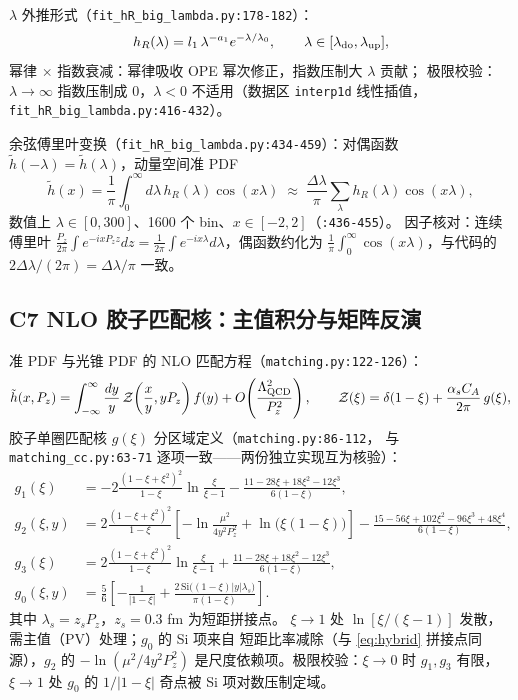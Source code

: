 \documentclass[UTF8]{ctexart}
\begin{document}
$\lambda$ 外推形式（\texttt{fit\_hR\_big\_lambda.py:178-182}）：
\begin{equation}\label{eq:lamext}
h_R(\lambda) = l_1\, \lambda^{-a_1} e^{-\lambda/\lambda_0},\qquad \lambda\in[\lambda_{\rm do},\lambda_{\rm up}],
\end{equation}
幂律 $\times$ 指数衰减：幂律吸收 OPE 幂次修正，指数压制大 $\lambda$ 贡献；
极限校验：$\lambda\to\infty$ 指数压制成 0，$\lambda<0$ 不适用（数据区
\texttt{interp1d} 线性插值，\texttt{fit\_hR\_big\_lambda.py:416-432}）。

余弦傅里叶变换（\texttt{fit\_hR\_big\_lambda.py:434-459}）：对偶函数
$\tilde h(-\lambda)=\tilde h(\lambda)$，动量空间准 PDF
\begin{equation}\label{eq:ft}
\tilde h(x) = \frac{1}{\pi}\int_0^\infty\!\! d\lambda\, h_R(\lambda)\cos(x\lambda)
\;\approx\; \frac{\Delta\lambda}{\pi}\sum_{\lambda} h_R(\lambda)\cos(x\lambda),
\end{equation}
数值上 $\lambda\in[0,300]$、1600 个 bin、$x\in[-2,2]$（\texttt{:436-455}）。
因子核对：连续傅里叶 $\frac{P_z}{2\pi}\int e^{-ixP_z z}dz =
\frac{1}{2\pi}\int e^{-ix\lambda}d\lambda$，偶函数约化为 $\frac{1}{\pi}\int_0^\infty
\cos(x\lambda)$，与代码的 $2\Delta\lambda/(2\pi)= \Delta\lambda/\pi$ 一致。

\subsection{C7 NLO 胶子匹配核：主值积分与矩阵反演}

准 PDF 与光锥 PDF 的 NLO 匹配方程（\texttt{matching.py:122-126}）：
\begin{equation}\label{eq:match}
\tilde h(x,P_z) = \int_{-\infty}^{\infty} \frac{dy}{y}\,\mathcal{Z}\!\left(\frac{x}{y}, yP_z\right) f(y)
+ O\!\left(\frac{\Lambda_{\rm QCD}^2}{P_z^2}\right),\qquad
\mathcal{Z}(\xi) = \delta(1-\xi) + \frac{\alpha_s C_A}{2\pi}\, g(\xi),
\end{equation}
胶子单圈匹配核 $g(\xi)$ 分区域定义（\texttt{matching.py:86-112}，
与 \texttt{matching\_cc.py:63-71} 逐项一致——两份独立实现互为核验）：
\begin{align}
g_1(\xi) &= -2\frac{(1-\xi+\xi^2)^2}{1-\xi}\ln\frac{\xi}{\xi-1}
- \frac{11-28\xi+18\xi^2-12\xi^3}{6(1-\xi)}, \label{eq:g1}\\[2pt]
g_2(\xi,y) &= 2\frac{(1-\xi+\xi^2)^2}{1-\xi}\left[-\ln\frac{\mu^2}{4y^2P_z^2}
+\ln\big(\xi(1-\xi)\big)\right]
- \frac{15-56\xi+102\xi^2-96\xi^3+48\xi^4}{6(1-\xi)}, \label{eq:g2}\\[2pt]
g_3(\xi) &= 2\frac{(1-\xi+\xi^2)^2}{1-\xi}\ln\frac{\xi}{\xi-1}
+ \frac{11-28\xi+18\xi^2-12\xi^3}{6(1-\xi)}, \label{eq:g3}\\[2pt]
g_0(\xi,y) &= \frac{5}{6}\left[-\frac{1}{|1-\xi|}
+ \frac{2\,\mathrm{Si}\big((1-\xi)|y|\lambda_s\big)}{\pi(1-\xi)}\right].\label{eq:g0}
\end{align}
其中 $\lambda_s = z_s P_z$，$z_s = 0.3$ fm 为短距拼接点。
$\xi\to1$ 处 $\ln[\xi/(\xi-1)]$ 发散，需主值（PV）处理；$g_0$ 的 Si 项来自
短距比率减除（与 \eqref{eq:hybrid} 拼接点同源），$g_2$ 的
$-\ln(\mu^2/4y^2P_z^2)$ 是尺度依赖项。极限校验：$\xi\to0$ 时 $g_1,g_3$ 有限，
$\xi\to1$ 处 $g_0$ 的 $1/|1-\xi|$ 奇点被 Si 项对数压制定域。
\end{document}
